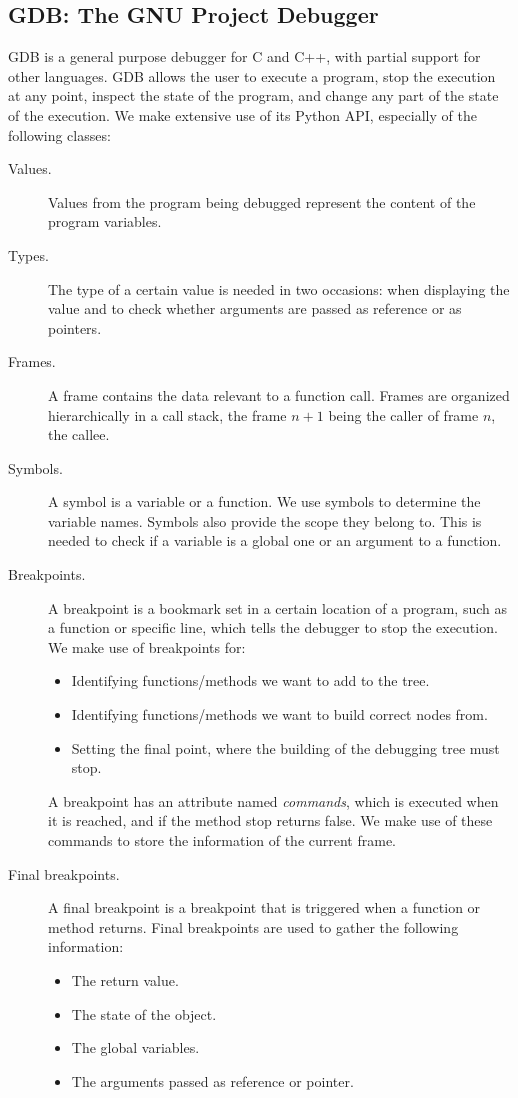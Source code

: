 \subsection{GDB: The GNU Project Debugger}

GDB \cite{gdb} is a general purpose debugger for C and C++, with partial support for other languages. GDB allows the user to execute a program, stop the execution at any point, inspect the state of the program, and change any part of the state of the execution.
%
We make extensive use of its Python API, especially of the following classes:

\begin{description}

\item[Values.]
Values from the program being debugged represent the content of the program variables.

\item[Types.]
The type of a certain value is needed in two occasions: when displaying the value and to check whether arguments are passed as reference or as pointers.
\item[Frames.] 
A frame contains the data relevant to a function call.
Frames are organized hierarchically in a call stack, the frame \(n+1\) being the caller of frame \(n\), the callee.
\item[Symbols.] A symbol is a variable or a function. We use symbols to determine the variable names. Symbols also provide the scope they belong to. This is needed to check if a variable is a global one or an argument to a function.

\item[Breakpoints.]
A breakpoint is a bookmark set in a certain location of a program, such as a function or specific line, which tells the debugger to stop the execution.
We make use of breakpoints for:
\begin{itemize}
    \item Identifying functions/methods we want to add to the tree.
    \item Identifying functions/methods we want to build correct nodes from.
    \item Setting the final point, where the building of the debugging tree must stop.
\end{itemize}
A breakpoint has an attribute named \emph{commands}, which is executed when it is reached, and if the method stop returns false.
%
We make use of these commands to store the information of the current frame.

\item[Final breakpoints.]
A final breakpoint is a breakpoint that is triggered when a function or method returns. Final breakpoints are used to gather the following information:
\begin{itemize}
    \item The return value.
    \item The state of the object.
    \item The global variables.
    \item The arguments passed as reference or pointer.
\end{itemize}
\end{description}
